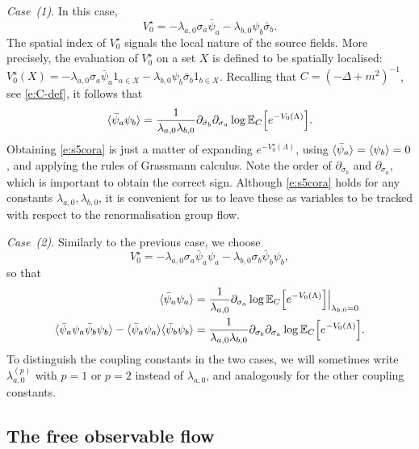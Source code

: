\documentclass[11pt]{amsart}
\numberwithin{equation}{section}
\numberwithin{theorem}{section}
\newcommand{\1}{{\bf 1}}
\newcommand{\obs}{\star}
\newcommand{\Vobs}{V^\obs}
\begin{document}
\medskip \noindent
\emph{Case~(1).}
In this case, 
\begin{equation} \label{e:Vobs0-a}
  \Vobs_0 = - \lambda_{a,0} \sigma_a \bar\psi_a 
  - \lambda_{b,0}\psi_b \bar\sigma_b  .
\end{equation}
The spatial index of $\Vobs_{0}$ signals the local nature of
the source fields. More precisely, the evaluation of
$\Vobs_{0}$ on a set $X$ is defined to be spatially localised:
$\Vobs_{0}(X) = - \lambda_{a,0} \sigma_a \bar\psi_a 1_{a\in X} -
\lambda_{b,0}\psi_b \bar\sigma_b 1_{b\in X}$. Recalling that
  $C=(-\Delta + m^{2})^{-1}$, see \eqref{e:C-def}, it follows that
\begin{equation}
  \label{e:s5cora}
  \langle \bar\psi_a\psi_b \rangle = \frac{1}{\lambda_{a,0}\lambda_{b,0}}
  \partial_{\bar\sigma_b}\partial_{\sigma_a}
  \log \mathbb{E}_{C} \Bigl[{e^{-V_0(\Lambda)}}\Bigr].
\end{equation}
Obtaining \eqref{e:s5cora} is
just a matter of expanding $e^{-V_{0}^{\obs}(\Lambda)}$, using
$\langle \bar\psi_{a} \rangle=\langle \psi_{b} \rangle=0$, and applying the rules of
Grassmann calculus.  Note the order of $\partial_{\bar\sigma_b}$ and
$\partial_{\sigma_a}$, which is important to obtain the correct sign.
Although \eqref{e:s5cora} holds for any constants
$\lambda_{a,0}, \lambda_{b,0}$, it is convenient for us to leave these
as variables to be tracked with respect to the renormalisation group flow.

\medskip \noindent
\emph{Case~(2).}
Similarly to the previous case, we choose
\begin{equation} \label{e:Vobs0-b}
  \Vobs_0 = - \lambda_{a,0} \sigma_a \bar\psi_a\psi_a 
  -
  \lambda_{b,0} \sigma_b\bar\psi_b\psi_b, 
\end{equation}
so that
\begin{align}
  \label{e:s5corb1}
  \langle \bar\psi_a\psi_a \rangle
  &= \frac{1}{\lambda_{a,0}} \partial_{\sigma_a} \log \mathbb{E}_{C} \Bigl[{e^{-V_0(\Lambda)}}\Bigr] \Big|_{\lambda_{b,0}=0}
  \\
  \label{e:s5corb2}
  \langle \bar\psi_a\psi_a\bar\psi_b\psi_b \rangle-\langle \bar\psi_a\psi_a \rangle\langle \bar\psi_b\psi_b \rangle
  &=
    \frac{1}{\lambda_{a,0}\lambda_{b,0}} \partial_{\sigma_b}\partial_{\sigma_a} \log \mathbb{E}_{C} \Bigl[{e^{-V_0(\Lambda)}}\Bigr]
    .
\end{align}
%
%
To distinguish the coupling constants in the two cases, we will
sometimes write $\lambda_{a,0}^{(p)}$ with $p=1$ or $p=2$ instead of
$\lambda_{a,0}$, and analogously for the other coupling constants.


\subsection{The free observable flow}
\label{sec:obs-free}
\end{document}
